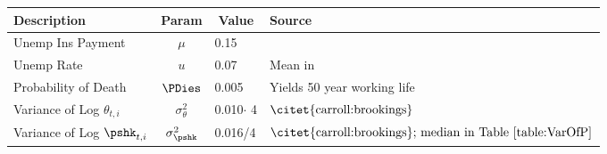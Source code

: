 \begin{center}
\begin{tabular}{l|c|l|l}
\hline
Description             & Param  & \multicolumn{1}{c|}{Value}  & Source \\ \hline
Unemp Ins Payment       & $\mu $   & 0.15 & \text{\citet{denhann:comp}}\\
Unemp Rate              & $u$      & 0.07 & Mean in \text{\citet{denhann:comp}}\\
Probability of Death    & $\PDies$ & 0.005& Yields 50 year working life \\
Variance of Log $\theta_{t,i}$ & $\sigma _{\theta }^{2}$ & 0.010$\cdot$ 4 & $\text{\citet{carroll:brookings}}$ \\
Variance of Log $\pshk_{t,i}$ & $\sigma _{\pshk}^{2}$ & 0.016/4 & $\text{\citet{carroll:brookings}; median in Table \ref{table:VarOfP}}$ \\ \hline
\end{tabular}
\end{center}

